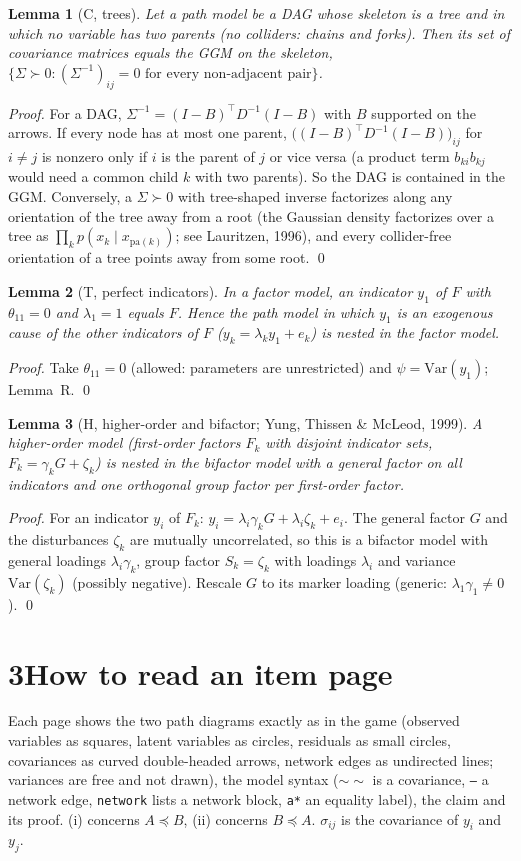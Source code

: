 \documentclass[10pt,a4paper]{article}
\newcommand{\nest}{\preceq}
\newtheorem*{lemma}{Lemma}
\begin{document}
\begin{lemma}[C, trees]
Let a path model be a DAG whose skeleton is a tree and in which no variable has two parents (no colliders: chains and forks). Then its set of covariance matrices equals the GGM on the skeleton, $\{\Sigma\succ0:(\Sigma^{-1})_{ij}=0\text{ for every non-adjacent pair}\}$.
\end{lemma}
\emph{Proof.} For a DAG, $\Sigma^{-1}=(I-B)^\top D^{-1}(I-B)$ with $B$ supported on the arrows. If every node has at most one parent, $\big((I-B)^\top D^{-1}(I-B)\big)_{ij}$ for $i\neq j$ is nonzero only if $i$ is the parent of $j$ or vice versa (a product term $b_{ki}b_{kj}$ would need a common child $k$ with two parents). So the DAG is contained in the GGM. Conversely, a $\Sigma\succ0$ with tree-shaped inverse factorizes along any orientation of the tree away from a root (the Gaussian density factorizes over a tree as $\prod_k p(x_k\mid x_{\mathrm{pa}(k)})$; see Lauritzen, 1996), and every collider-free orientation of a tree points away from some root. \qed

\begin{lemma}[T, perfect indicators]
In a factor model, an indicator $y_1$ of $F$ with $\theta_{11}=0$ and $\lambda_1=1$ equals $F$. Hence the path model in which $y_1$ is an exogenous cause of the other indicators of $F$ ($y_k=\lambda_ky_1+e_k$) is nested in the factor model.
\end{lemma}
\emph{Proof.} Take $\theta_{11}=0$ (allowed: parameters are unrestricted) and $\psi=\mathrm{Var}(y_1)$; Lemma~R. \qed

\begin{lemma}[H, higher-order and bifactor; Yung, Thissen \& McLeod, 1999]
A higher-order model (first-order factors $F_k$ with disjoint indicator sets, $F_k=\gamma_kG+\zeta_k$) is nested in the bifactor model with a general factor on all indicators and one orthogonal group factor per first-order factor.
\end{lemma}
\emph{Proof.} For an indicator $y_i$ of $F_k$: $y_i=\lambda_i\gamma_kG+\lambda_i\zeta_k+e_i$. The general factor $G$ and the disturbances $\zeta_k$ are mutually uncorrelated, so this is a bifactor model with general loadings $\lambda_i\gamma_k$, group factor $S_k=\zeta_k$ with loadings $\lambda_i$ and variance $\mathrm{Var}(\zeta_k)$ (possibly negative). Rescale $G$ to its marker loading (generic: $\lambda_{1}\gamma_1\neq0$). \qed

\section*{3\quad How to read an item page}
Each page shows the two path diagrams exactly as in the game (observed variables as squares, latent variables as circles, residuals as small circles, covariances as curved double-headed arrows, network edges as undirected lines; variances are free and not drawn), the model syntax ($\sim\sim$ is a covariance, \texttt{--} a network edge, \texttt{network} lists a network block, \texttt{a*} an equality label), the claim and its proof. (i) concerns $A\nest B$, (ii) concerns $B\nest A$. $\sigma_{ij}$ is the covariance of $y_i$ and $y_j$.
\end{document}
